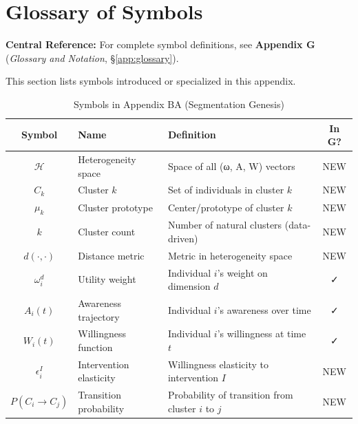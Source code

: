 \section{Glossary of Symbols}
\label{sec:ba-glossary}

\begin{tcolorbox}[colback=blue!5!white, colframe=blue!75!black]
\textbf{Central Reference:} For complete symbol definitions, see
\textbf{Appendix G} (\textit{Glossary and Notation}, \S\ref{app:glossary}).

This section lists symbols introduced or specialized in this appendix.
\end{tcolorbox}

\vspace{0.5em}

\begin{table}[htbp]
\centering
\caption{Symbols in Appendix BA (Segmentation Genesis)}
\label{tab:ba-symbols}
\renewcommand{\arraystretch}{1.4}
\begin{tabular}{@{}clp{5cm}c@{}}
\toprule
\textbf{Symbol} & \textbf{Name} & \textbf{Definition} & \textbf{In G?} \\
\midrule
$\mathcal{H}$ & Heterogeneity space & Space of all (ω, A, W) vectors & NEW \\
$C_k$ & Cluster $k$ & Set of individuals in cluster $k$ & NEW \\
$\mu_k$ & Cluster prototype & Center/prototype of cluster $k$ & NEW \\
$k$ & Cluster count & Number of natural clusters (data-driven) & NEW \\
$d(\cdot, \cdot)$ & Distance metric & Metric in heterogeneity space & NEW \\
$\omega_i^d$ & Utility weight & Individual $i$'s weight on dimension $d$ & ✓ \\
$A_i(t)$ & Awareness trajectory & Individual $i$'s awareness over time & ✓ \\
$W_i(t)$ & Willingness function & Individual $i$'s willingness at time $t$ & ✓ \\
$\epsilon_i^I$ & Intervention elasticity & Willingness elasticity to intervention $I$ & NEW \\
$P(C_i \to C_j)$ & Transition probability & Probability of transition from cluster $i$ to $j$ & NEW \\
\bottomrule
\end{tabular}
\end{table}

